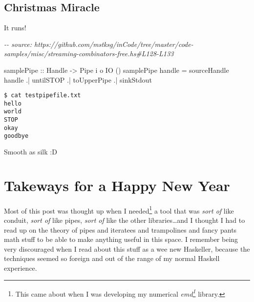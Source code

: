 \documentclass[]{article}
\newenvironment{Shaded}{}{}
\newcommand{\CommentTok}[1]{\textcolor[rgb]{0.38,0.63,0.69}{\textit{#1}}}
\newcommand{\DataTypeTok}[1]{\textcolor[rgb]{0.56,0.13,0.00}{#1}}
\newcommand{\NormalTok}[1]{#1}
\newcommand{\OperatorTok}[1]{\textcolor[rgb]{0.40,0.40,0.40}{#1}}
\newcommand{\OtherTok}[1]{\textcolor[rgb]{0.00,0.44,0.13}{#1}}
\newcommand{\StringTok}[1]{\textcolor[rgb]{0.25,0.44,0.63}{#1}}
\renewcommand{\href}[2]{#2\footnote{\url{#1}}}
\begin{document}
\subsection{Christmas Miracle}\label{christmas-miracle}

It runs!

\begin{Shaded}
\begin{Highlighting}[]
\CommentTok{{-}{-} source: https://github.com/mstksg/inCode/tree/master/code{-}samples/misc/streaming{-}combinators{-}free.hs\#L128{-}L133}

\OtherTok{samplePipe ::} \DataTypeTok{Handle} \OtherTok{{-}\textgreater{}} \DataTypeTok{Pipe}\NormalTok{ i o }\DataTypeTok{IO}\NormalTok{ ()}
\NormalTok{samplePipe handle }\OtherTok{=}
\NormalTok{       sourceHandle handle}
    \OperatorTok{.|}\NormalTok{ untilSTOP}
    \OperatorTok{.|}\NormalTok{ toUpperPipe}
    \OperatorTok{.|}\NormalTok{ sinkStdout}
\end{Highlighting}
\end{Shaded}

\begin{verbatim}
$ cat testpipefile.txt
hello
world
STOP
okay
goodbye
\end{verbatim}

\begin{Shaded}
\end{Shaded}

Smooth as silk :D

\section{Takeways for a Happy New Year}\label{takeways-for-a-happy-new-year}

Most of this post was thought up when I needed\footnote{This came about when I
  was developing my numerical
  \emph{\href{https://hackage.haskell.org/package/emd}{emd}} library.} a tool
that was \emph{sort of} like conduit, \emph{sort of} like pipes, \emph{sort of}
like the other libraries\ldots and I thought I had to read up on the theory of
pipes and iteratees and trampolines and fancy pants math stuff to be able to
make anything useful in this space. I remember being very discouraged when I
read about this stuff as a wee new Haskeller, because the techniques seemed so
foreign and out of the range of my normal Haskell experience.
\end{document}
